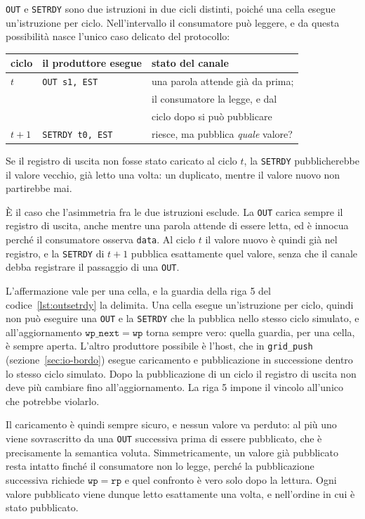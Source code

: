 \texttt{OUT} e \texttt{SETRDY} sono due istruzioni in due cicli distinti, poiché
una cella esegue un'istruzione per ciclo. Nell'intervallo il consumatore può
leggere, e da questa possibilità nasce l'unico caso delicato del protocollo:

\begin{center}
\begin{tabular}{lll}
    \toprule
    ciclo & il produttore esegue & stato del canale \\
    \midrule
    $t$   & \texttt{OUT s1, EST} & una parola attende già da prima; \\
          &                      & il consumatore la legge, e dal \\
          &                      & ciclo dopo si può pubblicare \\
    $t+1$ & \texttt{SETRDY t0, EST} & riesce, ma pubblica \emph{quale} valore? \\
    \bottomrule
\end{tabular}
\end{center}

Se il registro di uscita non fosse stato caricato al ciclo $t$, la
\texttt{SETRDY} pubblicherebbe il valore vecchio, già letto una volta: un
duplicato, mentre il valore nuovo non partirebbe mai.

È il caso che l'asimmetria fra le due istruzioni esclude. La \texttt{OUT} carica
sempre il registro di uscita, anche mentre una parola attende di essere letta,
ed è innocua perché il consumatore osserva \texttt{data}. Al ciclo $t$
il valore nuovo è quindi già nel registro, e la \texttt{SETRDY} di $t+1$
pubblica esattamente quel valore, senza che il canale debba registrare il
passaggio di una \texttt{OUT}.

L'affermazione vale per una cella, e la guardia della riga 5 del
codice~\ref{lst:outsetrdy} la delimita. Una cella esegue un'istruzione per
ciclo, quindi non può eseguire una \texttt{OUT} e la \texttt{SETRDY} che la
pubblica nello stesso ciclo simulato, e all'aggiornamento $\mathtt{wp\_next} =
\mathtt{wp}$ torna sempre vero: quella guardia, per una cella, è sempre aperta.
L'altro produttore possibile è l'host, che in \texttt{grid\_push}
(sezione~\ref{sec:io-bordo}) esegue caricamento e pubblicazione in successione
dentro lo stesso ciclo simulato. Dopo la pubblicazione di un ciclo il
registro di uscita non deve più cambiare fino all'aggiornamento. La riga 5
impone il vincolo all'unico che potrebbe violarlo.

Il caricamento è quindi sempre sicuro, e nessun valore va perduto: al più uno
viene sovrascritto da una \texttt{OUT} successiva prima di essere pubblicato,
che è precisamente la semantica voluta. Simmetricamente, un valore già
pubblicato resta intatto finché il consumatore non lo legge, perché la
pubblicazione successiva richiede $\mathtt{wp} = \mathtt{rp}$ e quel confronto
è vero solo dopo la lettura. Ogni valore pubblicato viene dunque letto
esattamente una volta, e nell'ordine in cui è stato pubblicato.

